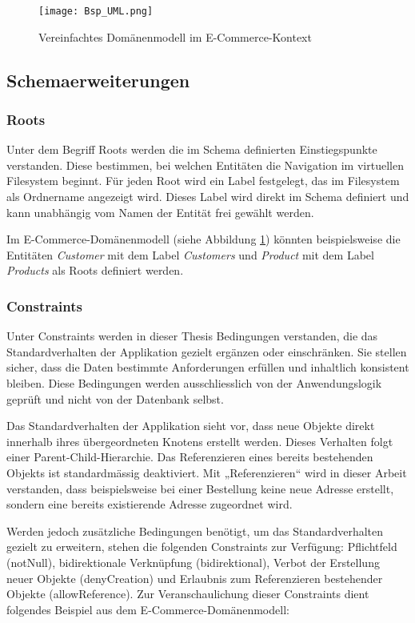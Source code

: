 \begin{figure}[H]
    \centering
    \texttt{[image: Bsp\_UML.png]}
    \caption{Vereinfachtes Domänenmodell im E-Commerce-Kontext}
    \label{fig:uml_domaenenmodell}
\end{figure}

\subsection{Schemaerweiterungen}
\label{ab:con}
\subsubsection{Roots}
Unter dem Begriff Roots werden die im Schema definierten Einstiegspunkte verstanden. Diese bestimmen, bei welchen Entitäten die Navigation im virtuellen Filesystem beginnt. Für jeden Root wird ein Label festgelegt, das im Filesystem als Ordnername angezeigt wird. Dieses Label wird direkt im Schema definiert und kann unabhängig vom Namen der Entität frei gewählt werden.

Im E-Commerce-Domänenmodell (siehe Abbildung \ref{fig:uml_domaenenmodell}) könnten beispielsweise die Entitäten \textit{Customer} mit dem Label \textit{Customers} und \textit{Product} mit dem Label \textit{Products} als Roots definiert werden.

\subsubsection{Constraints}
Unter Constraints werden in dieser Thesis Bedingungen verstanden, die das Standardverhalten der Applikation gezielt ergänzen oder einschränken. Sie stellen sicher, dass die Daten bestimmte Anforderungen erfüllen und inhaltlich konsistent bleiben. Diese Bedingungen werden ausschliesslich von der Anwendungslogik geprüft und nicht von der Datenbank selbst.

Das Standardverhalten der Applikation sieht vor, dass neue Objekte direkt innerhalb ihres übergeordneten Knotens erstellt werden. Dieses Verhalten folgt einer Parent-Child-Hierarchie. Das Referenzieren eines bereits bestehenden Objekts ist standardmässig deaktiviert. Mit „Referenzieren“ wird in dieser Arbeit verstanden, dass beispielsweise bei einer Bestellung keine neue Adresse erstellt, sondern eine bereits existierende Adresse zugeordnet wird.

Werden jedoch zusätzliche Bedingungen benötigt, um das Standardverhalten gezielt zu erweitern, stehen die folgenden Constraints zur Verfügung: Pflichtfeld (notNull), bidirektionale Verknüpfung (bidirektional), Verbot der Erstellung neuer Objekte (denyCreation) und Erlaubnis zum Referenzieren bestehender Objekte (allowReference). Zur Veranschaulichung dieser Constraints dient folgendes Beispiel aus dem E-Commerce-Domänenmodell:


